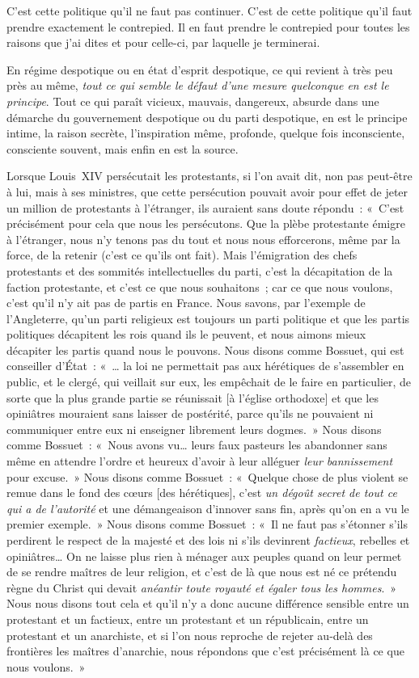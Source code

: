 \documentclass[french,twoside]{book} %
\begin{document}
\noindent C’est cette politique qu’il ne faut pas continuer. C’est de cette politique qu’il faut prendre exactement le contrepied. Il en faut prendre le contrepied pour toutes les raisons que j’ai dites et pour celle-ci, par laquelle je terminerai.\par
En régime despotique ou en état d’esprit despotique, ce qui revient à très peu près au même, {\itshape tout ce qui semble le défaut d’une mesure quelconque en est le principe}. Tout ce qui paraît vicieux, mauvais, dangereux, absurde dans une démarche du gouvernement despotique ou du parti despotique, en est le principe intime, la raison secrète, l’inspiration même, profonde, quelque fois inconsciente, consciente souvent, mais enfin en est la source.\par
Lorsque Louis XIV persécutait les protestants, si l’on avait dit, non pas peut-être à lui, mais à ses ministres, que cette persécution pouvait avoir pour effet de jeter un million de protestants à l’étranger, ils auraient sans doute répondu : « C’est précisément pour cela que nous les persécutons. Que la plèbe protestante émigre à l’étranger, nous n’y tenons pas du tout et nous nous efforcerons, même par la force, de la retenir (c’est ce qu’ils ont  fait). Mais l’émigration des chefs protestants et des sommités intellectuelles du parti, c’est la décapitation de la faction protestante, et c’est ce que nous souhaitons ; car ce que nous voulons, c’est qu’il n’y ait pas de partis en France. Nous savons, par l’exemple de l’Angleterre, qu’un parti religieux est toujours un parti politique et que les partis politiques décapitent les rois quand ils le peuvent, et nous aimons mieux décapiter les partis quand nous le pouvons. Nous disons comme Bossuet, qui est conseiller d’État : « … la loi ne permettait pas aux hérétiques de s’assembler en public, et le clergé, qui veillait sur eux, les empêchait de le faire en particulier, de sorte que la plus grande partie se réunissait [à l’église orthodoxe] et que les opiniâtres mouraient sans laisser de postérité, parce qu’ils ne pouvaient ni communiquer entre eux ni enseigner librement leurs dogmes. » Nous disons comme Bossuet : « Nous avons vu… leurs faux pasteurs les abandonner sans même en attendre l’ordre et heureux d’avoir à leur alléguer {\itshape leur bannissement} pour excuse. » Nous disons comme Bossuet : « Quelque chose de plus violent se remue dans le fond des cœurs [des hérétiques], c’est {\itshape un dégoût secret de tout ce qui a de l’autorité} et une démangeaison d’innover sans fin, après qu’on en a vu le premier exemple. »  Nous disons comme Bossuet : « Il ne faut pas s’étonner s’ils perdirent le respect de la majesté et des lois ni s’ils devinrent {\itshape factieux}, rebelles et opiniâtres… On ne laisse plus rien à ménager aux peuples quand on leur permet de se rendre maîtres de leur religion, et c’est de là que nous est né ce prétendu règne du Christ qui devait {\itshape anéantir toute royauté et égaler tous les hommes}. » Nous nous disons tout cela et qu’il n’y a donc aucune différence sensible entre un protestant et un factieux, entre un protestant et un républicain, entre un protestant et un anarchiste, et si l’on nous reproche de rejeter au-delà des frontières les maîtres d’anarchie, nous répondons que c’est précisément là ce que nous voulons. »\par
\end{document}

